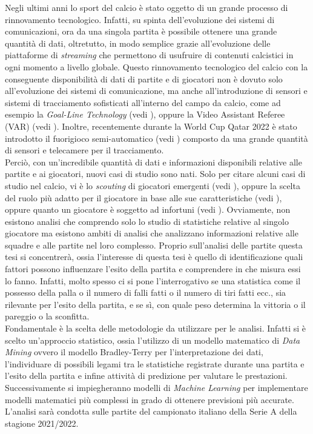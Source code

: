 Negli ultimi anni lo sport del calcio è stato oggetto di un grande processo di rinnovamento tecnologico. Infatti, su spinta dell'evoluzione dei sistemi di comunicazioni, ora da una singola partita è possibile ottenere una grande quantità di dati, oltretutto, in modo semplice grazie all'evoluzione delle piattaforme di \emph{streaming} che permettono di usufruire di contenuti calcistici in ogni momento a livello globale. Questo rinnovamento tecnologico del calcio con la conseguente disponibilità di dati di partite e di giocatori non è dovuto solo all'evoluzione dei sistemi di comunicazione, ma anche all'introduzione di sensori e sistemi di tracciamento sofisticati all'interno del campo da calcio, come ad esempio la \emph{Goal-Line Technology} (vedi \textit{\cite{glt}}), oppure la Video Assistant Referee (VAR) (vedi \textit{\cite{var}}). Inoltre, recentemente durante la World Cup Qatar 2022 è stato introdotto il fuorigioco semi-automatico (vedi \textit{\cite{offside}}) composto da una grande quantità di sensori e telecamere per il tracciamento. \\
Perciò, con un'incredibile quantità di dati e informazioni disponibili relative alle partite e ai giocatori, nuovi casi di studio sono nati. Solo per citare alcuni casi di studio nel calcio, vi è lo \textit{scouting} di giocatori emergenti (vedi \autocite{vilela2018towards}), oppure la scelta del ruolo più adatto per il giocatore in base alle sue caratteristiche (vedi \autocite{razali2017predicting}), oppure quanto un giocatore è soggetto ad infortuni (vedi \autocite{theron2020use}). Ovviamente, non esistono analisi che comprendo solo lo studio di statistiche relative al singolo giocatore ma esistono ambiti di analisi che analizzano informazioni relative alle squadre e alle partite nel loro complesso. Proprio sull'analisi delle partite questa tesi si concentrerà, ossia l'interesse di questa tesi è quello di identificazione quali fattori possono influenzare l'esito della partita e comprendere in che misura essi lo fanno. Infatti, molto spesso ci si pone l'interrogativo se una statistica come il possesso della palla o il numero di falli fatti o il numero di tiri fatti ecc., sia rilevante per l'esito della partita, e se sì, con quale peso determina la vittoria o il pareggio o la sconfitta.\\
Fondamentale è la scelta delle metodologie da utilizzare per le analisi. Infatti si è scelto un'approccio statistico, ossia l'utilizzo di un modello matematico di \emph{Data Mining} ovvero il modello Bradley-Terry \autocite{bradley1952rank} per l'interpretazione dei dati, l'individuare di possibili legami tra le statistiche registrate durante una partita e l'esito della partita e infine attività di predizione per valutare le prestazioni. Successivamente si impiegheranno modelli di \emph{Machine Learning} per implementare modelli matematici più complessi in grado di ottenere previsioni più accurate. L'analisi sarà condotta sulle partite del campionato italiano della Serie A della stagione 2021/2022.
